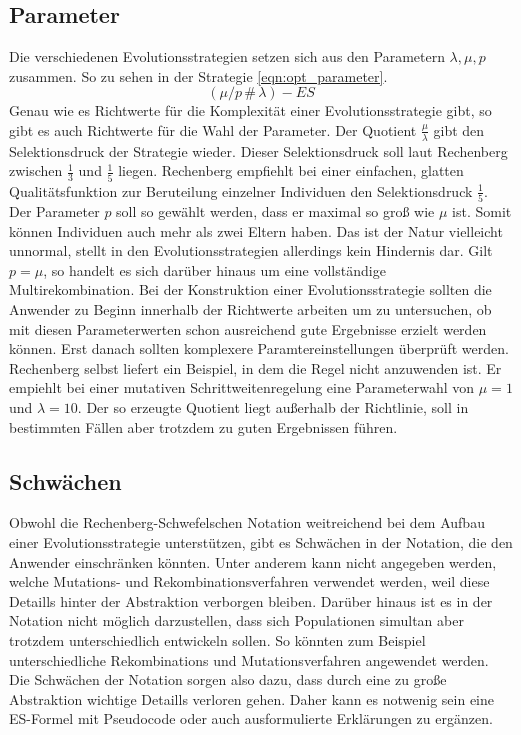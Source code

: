 \subsection{Parameter}
Die verschiedenen Evolutionsstrategien setzen sich aus den Parametern $\lambda, \mu, p$ zusammen. So zu sehen in der Strategie \ref{eqn:opt_parameter}.
\begin{equation}
\label{eqn:opt_parameter}
(\mu/p\,\#\,\lambda)-ES
\end{equation}
Genau wie es Richtwerte für die Komplexität einer Evolutionsstrategie gibt, so gibt es auch Richtwerte für die Wahl der Parameter.
Der Quotient $\frac{\mu}{\lambda}$ gibt den Selektionsdruck der Strategie wieder. Dieser Selektionsdruck soll laut Rechenberg zwischen $\frac{1}{3}$ und $\frac{1}{5}$ liegen. Rechenberg empfiehlt bei einer einfachen, glatten Qualitätsfunktion zur Beruteilung einzelner Individuen den Selektionsdruck  $\frac{1}{5}$.
Der Parameter $p$ soll so gewählt werden, dass er maximal so groß wie $\mu$ ist. Somit können Individuen auch mehr als zwei Eltern haben. Das ist der Natur vielleicht unnormal, stellt in den Evolutionsstrategien allerdings kein Hindernis dar. Gilt $p=\mu$, so handelt es sich darüber hinaus um eine vollständige Multirekombination.
Bei der Konstruktion einer Evolutionsstrategie sollten die Anwender zu Beginn innerhalb der Richtwerte arbeiten um zu untersuchen, ob mit diesen Parameterwerten schon ausreichend gute Ergebnisse erzielt werden können. Erst danach sollten komplexere Paramtereinstellungen überprüft werden.
Rechenberg selbst liefert ein Beispiel, in dem die Regel nicht anzuwenden ist. Er empiehlt bei einer mutativen Schrittweitenregelung eine Parameterwahl von $\mu=1$ und $\lambda=10$. Der so erzeugte Quotient liegt außerhalb der Richtlinie, soll in bestimmten Fällen aber trotzdem zu guten Ergebnissen führen.

\subsection{Schwächen}
Obwohl die Rechenberg-Schwefelschen Notation weitreichend bei dem Aufbau einer Evolutionsstrategie unterstützen, gibt es Schwächen in der Notation, die den Anwender einschränken könnten.
Unter anderem kann nicht angegeben werden, welche Mutations- und Rekombinationsverfahren verwendet werden, weil diese Detaills hinter der Abstraktion verborgen bleiben.
Darüber hinaus ist es in der Notation nicht möglich darzustellen, dass sich Populationen simultan aber trotzdem unterschiedlich entwickeln sollen. So könnten zum Beispiel unterschiedliche Rekombinations und Mutationsverfahren angewendet werden.
Die Schwächen der Notation sorgen also dazu, dass durch eine zu große Abstraktion wichtige Detaills verloren gehen. Daher kann es notwenig sein eine ES-Formel mit Pseudocode oder auch ausformulierte Erklärungen zu ergänzen. 